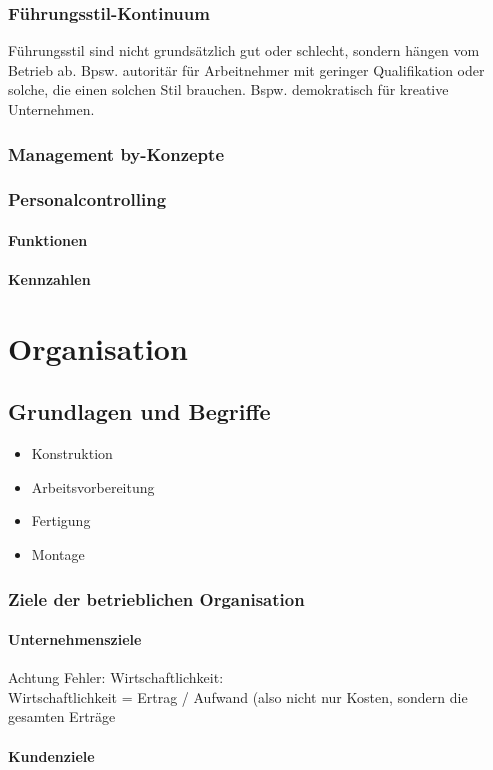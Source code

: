 \documentclass{scrreprt}
\begin{document}
\subsection{Führungsstil-Kontinuum}
Führungsstil sind nicht grundsätzlich gut oder schlecht, sondern hängen vom Betrieb ab. Bpsw. autoritär für Arbeitnehmer mit geringer Qualifikation oder solche, die einen solchen Stil brauchen. Bspw. demokratisch für kreative Unternehmen.
\subsection{Management by-Konzepte}
\subsection{Personalcontrolling}
\subsubsection{Funktionen}
\subsubsection{Kennzahlen}
\chapter{Organisation}
\section{Grundlagen und Begriffe}
\begin{itemize}
\item Konstruktion
\item Arbeitsvorbereitung
\item Fertigung
\item Montage
\end{itemize}
\subsection{Ziele der betrieblichen Organisation}
\subsubsection{Unternehmensziele}
Achtung Fehler: Wirtschaftlichkeit:\\
Wirtschaftlichkeit = Ertrag / Aufwand (also nicht nur Kosten, sondern die gesamten Erträge
\subsubsection{Kundenziele}
\end{document}
